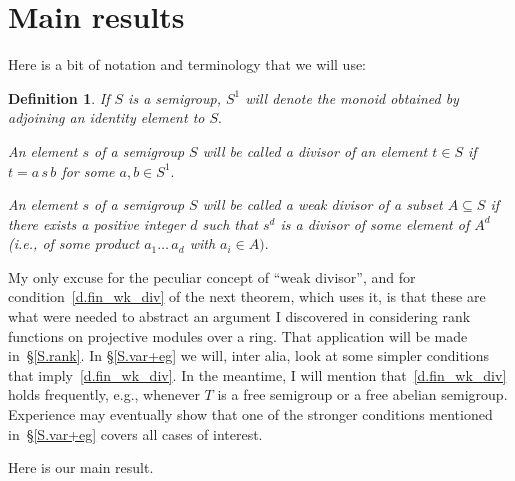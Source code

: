 \documentclass{amsart}
\newtheorem{definition}[theorem]{Definition}
\numberwithin{equation}{section}
\numberwithin{theorem}{section}
\newcommand{\2}{\mathbf{2}}
\begin{document}
\section{Main results}\label{S.main}

Here is a bit of notation and terminology that we will use:

\begin{definition}\label{D.divisor}
If $S$ is a semigroup, $S^1$ will denote the
monoid obtained by adjoining an identity element to $S.$

An element $s$ of a semigroup $S$ will be called
a {\em divisor} of an element $t\in S$
if $t = a\,s\,b$ for some $a, b\in S^1.$

An element $s$ of a semigroup $S$ will be called
a {\em weak divisor} of a
subset $A\subseteq S$ if there exists a positive
integer $d$ such that $s^d$ is a divisor of some element
of $A^d$ {\rm(}i.e., of some product $a_1\dots\,a_d$ with $a_i\in A).$
\end{definition}

My only excuse for the peculiar concept of ``weak
divisor'', and for condition~\eqref{d.fin_wk_div}
of the next theorem, which uses it, is that
these are what were needed to abstract an argument I discovered in
considering rank functions on projective modules over a ring.
That application will be made in~\S\ref{S.rank}.
In \S\ref{S.var+eg} we will, inter alia, look at some simpler
conditions that imply~\eqref{d.fin_wk_div}.
In the meantime, I will mention
that~\eqref{d.fin_wk_div} holds frequently, e.g.,
whenever $T$ is a free semigroup or a free abelian semigroup.
Experience may eventually show that one of the stronger conditions
mentioned in~\S\ref{S.var+eg} covers all cases of interest.

Here is our main result.
\end{document}
